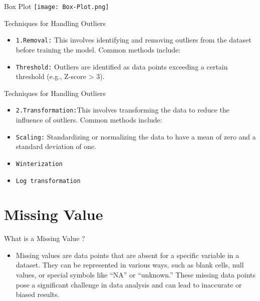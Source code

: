 \documentclass[serif, aspectratio=169]{beamer}
\begin{document}
\begin{frame}{Box Plot}
    \centering
    \texttt{[image: Box-Plot.png]}
\end{frame}

\begin{frame}{Techniques for Handling Outliers}
    \begin{itemize}
        \item \texttt{\color{red}1.Removal:} This involves identifying and removing outliers from the dataset before training the model. Common methods include:
        \item \texttt{\color{red}Threshold:} Outliers are identified as data points exceeding a certain threshold (e.g., Z-score > 3).
    \end{itemize}
\end{frame}

\begin{frame}{Techniques for Handling Outliers}
    \begin{itemize}
        \item \texttt{\color{red}2.Transformation:}This involves transforming the data to reduce the influence of outliers. Common methods include:
        \item \texttt{\color{red}Scaling:} Standardizing or normalizing the data to have a mean of zero and a standard deviation of one.
        \item \texttt{\color{red}Winterization} 
        \item \texttt{\color{red}Log transformation} 
    \end{itemize}
\end{frame}


\section{Missing Value}

\begin{frame}{What is a Missing Value ?}
    \begin{itemize}
        \item Missing values are data points that are absent for a specific variable in a dataset. They can be represented in various ways, such as blank cells, null values, or special symbols like “NA” or “unknown.” These missing data points pose a significant challenge in data analysis and can lead to inaccurate or biased results. 
    \end{itemize}
\end{frame}
\end{document}
